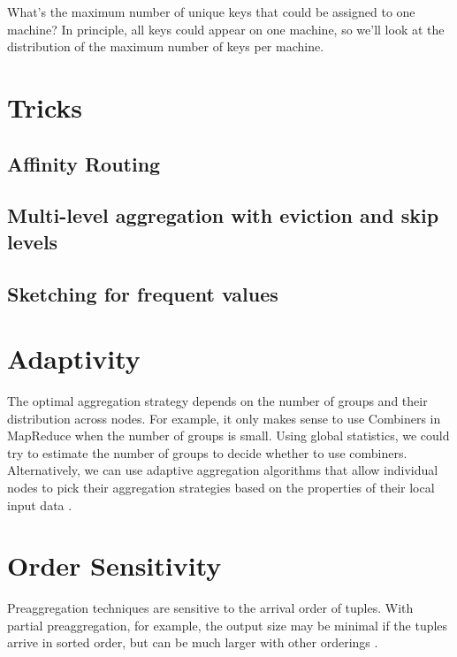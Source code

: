 \documentclass[12pt]{article}
\begin{document}
What's the maximum number of unique keys that could be assigned to one machine?  In principle, all keys could appear on one machine, so we'll look at the distribution of the maximum number of keys per machine.


\pagebreak
\section{Tricks}

\subsection{Affinity Routing}

\subsection{Multi-level aggregation with eviction and skip levels}

\subsection{Sketching for frequent values}


\section{Adaptivity}

The optimal aggregation strategy depends on the number of groups and their
distribution across nodes.
For example, it only makes sense to use Combiners in MapReduce when the number of groups is small.
Using global statistics, we could try to estimate the number of groups to decide whether to use combiners.
Alternatively, we can use adaptive aggregation algorithms that allow individual nodes to pick their aggregation strategies based on the properties of their local input data \cite{adaptive-aggregation}.


\section{Order Sensitivity}
Preaggregation techniques are sensitive to the arrival order of tuples.  With partial preaggregation, for example, the output size may be minimal if the tuples arrive in sorted order, but can be much larger with other orderings \cite{partial-preaggregation}.
\end{document}
